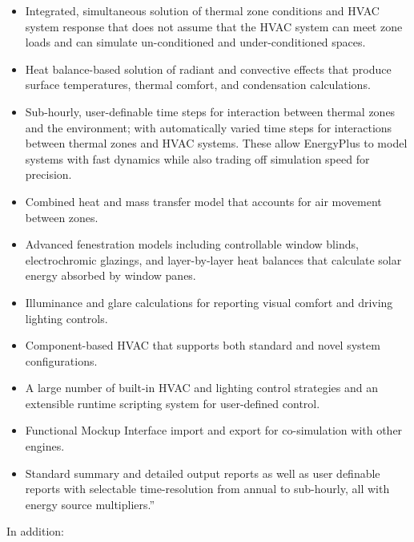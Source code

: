 \begin{itemize}
\item Integrated, simultaneous solution of thermal zone conditions and HVAC
system response that does not assume that the HVAC system can meet
zone loads and can simulate un-conditioned and under-conditioned spaces.
\item Heat balance-based solution of radiant and convective effects that
produce surface temperatures, thermal comfort, and condensation calculations.
\item Sub-hourly, user-definable time steps for interaction between thermal
zones and the environment; with automatically varied time steps for
interactions between thermal zones and HVAC systems. These allow EnergyPlus
to model systems with fast dynamics while also trading off simulation
speed for precision.
\item Combined heat and mass transfer model that accounts for air movement
between zones.
\item Advanced fenestration models including controllable window blinds,
electrochromic glazings, and layer-by-layer heat balances that calculate
solar energy absorbed by window panes.
\item Illuminance and glare calculations for reporting visual comfort and
driving lighting controls.
\item Component-based HVAC that supports both standard and novel system
configurations.
\item A large number of built-in HVAC and lighting control strategies and
an extensible runtime scripting system for user-defined control.
\item Functional Mockup Interface import and export for co-simulation with
other engines.
\item Standard summary and detailed output reports as well as user definable
reports with selectable time-resolution from annual to sub-hourly,
all with energy source multipliers.''
\end{itemize}
In addition:

